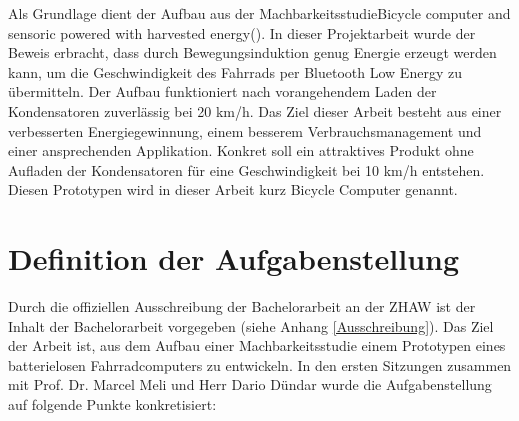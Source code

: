 Als Grundlage dient der Aufbau aus der Machbarkeitsstudie\glqq  Bicycle computer and sensoric powered with harvested energy\grqq (\cite{PA_bicycle}). In dieser Projektarbeit wurde der Beweis erbracht, dass durch Bewegungsinduktion genug Energie erzeugt werden kann, um die Geschwindigkeit des Fahrrads per Bluetooth Low Energy zu übermitteln. Der Aufbau funktioniert nach vorangehendem Laden der Kondensatoren zuverlässig bei 20 km/h. Das Ziel dieser Arbeit besteht aus einer verbesserten Energiegewinnung, einem besserem Verbrauchsmanagement und einer ansprechenden Applikation. Konkret soll ein attraktives Produkt ohne Aufladen der Kondensatoren für eine Geschwindigkeit bei 10 km/h entstehen. Diesen Prototypen wird in dieser Arbeit kurz Bicycle Computer genannt.



\section{Definition der Aufgabenstellung}\label{Aufgabenstellung} 

Durch die offiziellen Ausschreibung der Bachelorarbeit an der ZHAW ist der Inhalt der Bachelorarbeit vorgegeben (siehe Anhang \ref{Ausschreibung}). Das Ziel der Arbeit ist, aus dem Aufbau einer Machbarkeitsstudie einem Prototypen eines batterielosen Fahrradcomputers zu entwickeln. In den ersten Sitzungen zusammen mit Prof. Dr. Marcel Meli und Herr Dario Dündar wurde die Aufgabenstellung auf folgende Punkte konkretisiert:

